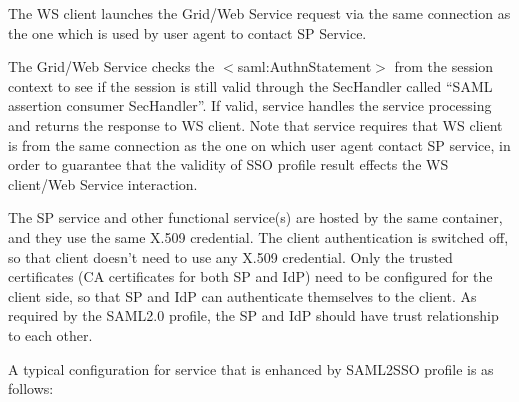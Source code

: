\documentclass{book}
\begin{document}
\begin{list}{.}
    \item The WS client launches the Grid/Web Service request via the same connection as the one which is used by user agent to contact SP Service.

    \item The Grid/Web Service checks the $<$saml:AuthnStatement$>$ from the session context to see if the session is still valid through the SecHandler called ``SAML assertion consumer SecHandler''. If valid, service handles the service processing and returns the response to WS client. Note that service requires that WS client is from the same connection as the one on which user agent contact SP service, in order to guarantee that the validity of SSO profile result effects the WS client/Web Service interaction.

    The SP service and other functional service(s) are hosted by the same container, and they use the same X.509 credential. The client authentication is switched off, so that client doesn’t need to use any X.509 credential. Only the trusted certificates (CA certificates for both SP and IdP) need to be configured for the client side, so that SP and IdP can authenticate themselves to the client. As required by the SAML2.0 profile, the SP and IdP should have trust relationship to each other.
   \end{list}

    A typical configuration for service that is enhanced by SAML2SSO profile is as follows:
\end{document}
